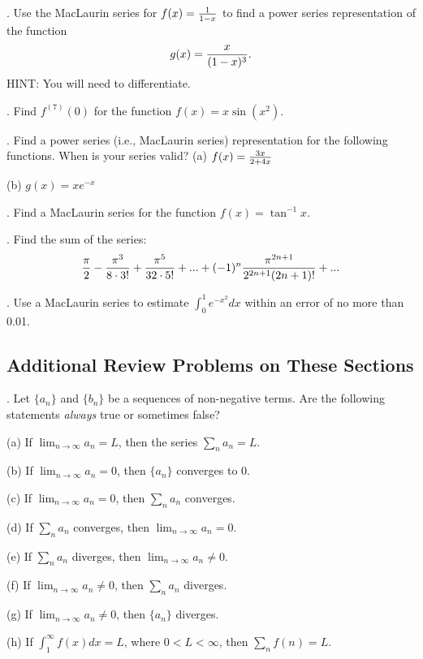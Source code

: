\documentclass[12pt]{article}
\begin{document}
\medskip
{}.  Use the MacLaurin series for $f(x)={{1}\over{1-x}}$ 
to find a power series representation of the function 
$$g(x)={{x}\over{(1-x)^3}}.$$
HINT: You will need to differentiate.

\medskip
{}.  Find $f^{(7)}(0)$ for the function $f(x)=x \sin (x^2)$.

\medskip
{}.  Find a power series (i.e., MacLaurin series) representation 
for the following functions.
When is your series valid? \hfil\break
\noindent (a)  $f(x)={{3x}\over{2+4x}}$ 

\medskip
\noindent (b)  $g(x)=xe^{-x}$ 

\medskip
{}.  Find a MacLaurin series for the function $f(x) = \tan^{-1} 
x$.

\medskip
{}.  Find the sum of the series:
$${{\pi}\over{2}} - {{\pi^3}\over{8 \cdot 3!}} + {{\pi^5}\over{32 \cdot 
5!}}
+ ... + (-1)^n {{\pi^{2n+1}}\over{2^{2n+1} (2n+1)!}} + ...$$

\medskip
{}.  Use a MacLaurin series to estimate $\int_0^1 e^{-x^2} dx$
within an error of no more than 0.01.

\subsection*{Additional Review Problems on These Sections}

.  Let $\{a_n\}$ and $\{b_n\}$ be a sequences of non-negative 
terms.  Are the following statements {\it always} true or sometimes false?

\noindent (a) If $\lim_{n \to \infty} {a_n}=L$, then the series $\sum_n a_n 
= L$.

\noindent (b) If $\lim_{n \to \infty} a_n = 0$, then $\{a_n\}$ converges 
to 0.

\noindent (c) If $\lim_{n \to \infty} a_n = 0$, then $\sum_n a_n$ 
converges.

\noindent (d) If $\sum_n a_n$ converges, then $\lim_{n \to \infty} a_n = 
0$.

\noindent (e) If $\sum_n a_n$ diverges, then $\lim_{n \to \infty} a_n \neq 
0$.

\noindent (f) If $\lim_{n \to \infty} a_n \neq 0$, then $\sum_n a_n$ 
diverges.

\noindent (g) If $\lim_{n \to \infty} a_n \neq 0$, then $\{a_n\}$ 
diverges.

\noindent (h) If $\int_1^{\infty} f(x) dx = L$, where $0 < L < \infty$, 
then $\sum_n f(n) = L$.
\end{document}
